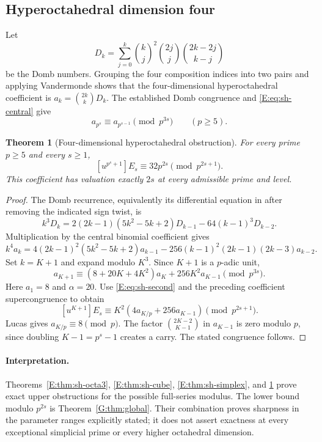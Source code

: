 \documentclass[11pt,a4paper]{article}
\newtheorem{theorem}{Theorem}[section]
\theoremstyle{definition}\newtheorem{definition}[theorem]{Definition}
\theoremstyle{remark}\newtheorem{remark}[theorem]{Remark}
\numberwithin{equation}{section}
\begin{document}
\subsection{Hyperoctahedral dimension four}

Let
\[
 D_k=\sum_{j=0}^k\binom kj^2\binom{2j}{j}
                         \binom{2k-2j}{k-j}
\]
be the Domb numbers.  Grouping the four composition indices into two
pairs and applying Vandermonde shows that the four-dimensional
hyperoctahedral coefficient is $a_k=\binom{2k}{k}D_k$.
The established Domb congruence
\cite[Theorem~1.1, with $A=2$, $B=C=1$]{OS12} and
\eqref{E:eq:sh-central} give
\[
 a_{p^s}\equiv a_{p^{s-1}}\pmod{p^{3s}}
 \qquad(p\geq5).
\]

\begin{theorem}[Four-dimensional hyperoctahedral obstruction]
\label{E:thm:sh-octa4}
For every prime $p\geq5$ and every $s\geq1$,
\[
 [u^{p^s+1}]E_s\equiv32p^{2s}\pmod{p^{2s+1}}.
\]
This coefficient has valuation exactly $2s$ at every admissible prime
and level.
\end{theorem}
\begin{proof}
The Domb recurrence, equivalently its differential equation in
\cite[Appendix~C, \S9.7]{Beu26} after removing the indicated sign twist,
is
\[
 k^3D_k=2(2k-1)(5k^2-5k+2)D_{k-1}-64(k-1)^3D_{k-2}.
\]
Multiplication by the central binomial coefficient gives
\[
 k^4a_k=4(2k-1)^2(5k^2-5k+2)a_{k-1}
       -256(k-1)^2(2k-1)(2k-3)a_{k-2}.
\]
Set $k=K+1$ and expand modulo $K^3$.  Since $K+1$ is a $p$-adic
unit,
\[
 a_{K+1}\equiv(8+20K+4K^2)a_K+256K^2a_{K-1}
       \pmod{p^{3s}}.
\]
Here $a_1=8$ and $\alpha=20$.
Use \eqref{E:eq:sh-second} and the preceding coefficient
supercongruence to obtain
\[
 [u^{K+1}]E_s
 \equiv K^2(4a_{K/p}+256a_{K-1})\pmod{p^{2s+1}}.
\]
Lucas gives $a_{K/p}\equiv8\pmod p$.
The factor $\binom{2K-2}{K-1}$ in $a_{K-1}$ is zero modulo $p$,
since doubling $K-1=p^s-1$ creates a carry.
The stated congruence follows.
\end{proof}

\paragraph{Interpretation.}
Theorems~\ref{E:thm:sh-octa3}, \ref{E:thm:sh-cube},
\ref{E:thm:sh-simplex}, and \ref{E:thm:sh-octa4} prove exact upper
obstructions for the possible full-series modulus. The lower bound modulo $p^{2s}$ is Theorem~\ref{G:thm:global}. Their combination proves sharpness in the parameter ranges explicitly stated; it does not assert exactness at every exceptional simplicial prime or every higher octahedral dimension.
\end{document}

